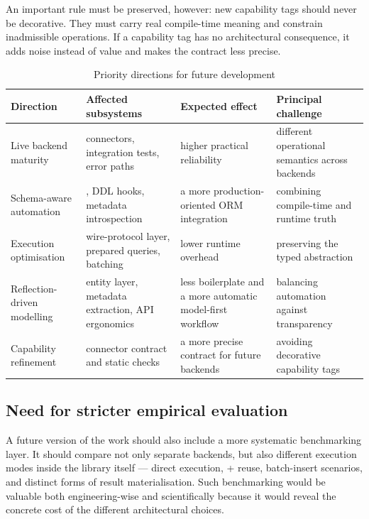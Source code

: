 An important rule must be preserved, however: new capability tags should never be decorative. They must carry real compile-time meaning and constrain inadmissible operations. If a capability tag has no architectural consequence, it adds noise instead of value and makes the contract less precise.

\begin{table}[H]
\centering
\small
\caption{Priority directions for future development}
\label{tab:future_work_priorities}
\begin{tabularx}{\textwidth}{L{3.0cm}L{3.2cm}L{3.1cm}Y}
\toprule
\textbf{Direction} & \textbf{Affected subsystems} & \textbf{Expected effect} & \textbf{Principal challenge} \\
\midrule
Live backend maturity & connectors, integration tests, error paths & higher practical reliability & different operational semantics across backends \\
Schema-aware automation & , DDL hooks, metadata introspection & a more production-oriented ORM integration & combining compile-time and runtime truth \\
Execution optimisation & wire-protocol layer, prepared queries, batching & lower runtime overhead & preserving the typed abstraction \\
Reflection-driven modelling & entity layer, metadata extraction, API ergonomics & less boilerplate and a more automatic model-first workflow & balancing automation against transparency \\
Capability refinement & connector contract and static checks & a more precise contract for future backends & avoiding decorative capability tags \\
\bottomrule
\end{tabularx}
\end{table}

\subsection{Need for stricter empirical evaluation}

A future version of the work should also include a more systematic benchmarking layer. It should compare not only separate backends, but also different execution modes inside the library itself --- direct execution,  + reuse, batch-insert scenarios, and distinct forms of result materialisation. Such benchmarking would be valuable both engineering-wise and scientifically because it would reveal the concrete cost of the different architectural choices.

